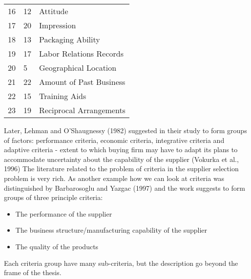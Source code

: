 \documentclass[oneside,12pt]{article}%
\begin{document}
\begin{table}[h]
\begin{tabular}{lll}
    \multicolumn{1}{l|}{16}      & \multicolumn{1}{l|}{12}           & Attitude \\
    \multicolumn{1}{l|}{17}      & \multicolumn{1}{l|}{20}           & Impression \\
    \multicolumn{1}{l|}{18}      & \multicolumn{1}{l|}{13}           & Packaging Ability \\
    \multicolumn{1}{l|}{19}      & \multicolumn{1}{l|}{17}           & Labor Relations Records \\
    \multicolumn{1}{l|}{20}      & \multicolumn{1}{l|}{5}            & Geographical Location \\
    \multicolumn{1}{l|}{21}      & \multicolumn{1}{l|}{22}           & Amount of Past Business \\
    \multicolumn{1}{l|}{22}      & \multicolumn{1}{l|}{15}           & Training Aids \\
    \multicolumn{1}{l|}{23}      & \multicolumn{1}{l|}{19}           & Reciprocal Arrangements
  \end{tabular}
\end{table}

Later, Lehman and O’Shaugnessy (1982) suggested in their study to form groups of factors: performance criteria, economic criteria, integrative criteria and adaptive criteria - extent to which buying firm may have to adapt its plans to accommodate uncertainty about the capability of the supplier (Vokurka et al., 1996) The literature related to the problem of criteria in the supplier selection problem is very rich. As another example how we can look at criteria was distinguished by Barbarosoglu and Yazgac (1997) and the work suggests to form groups of three principle criteria:

  \begin{itemize}
    \item The performance of the supplier
    \item The business structure/manufacturing capability of the supplier
    \item The quality of the products
  \end{itemize}

Each criteria group have many sub-criteria, but the description go beyond the frame of the thesis.
\end{document}
